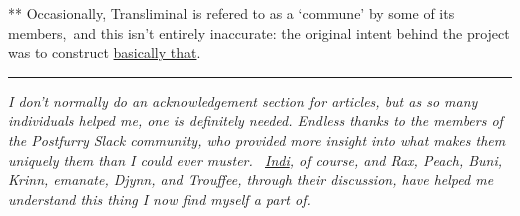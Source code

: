 ** Occasionally, Transliminal is refered to as a `commune' by some of
its members,~and this isn't entirely inaccurate: the original intent
behind the project was to construct
\href{http://wiki.postfurry.net/wiki/Lapinian_Embassy}{basically that}.

\begin{center}\rule{0.5\linewidth}{\linethickness}\end{center}

\emph{I don't normally do an acknowledgement section for articles, but
as so many individuals helped me, one is definitely needed. Endless
thanks to the members of the Postfurry Slack community, who provided
more insight into what makes them uniquely them than I could ever
muster.{~ \href{https://twitter.com/indilatrani}{Indi}}, of course, and
Rax, Peach, Buni, Krinn, emanate, Djynn, and Trouffee, through their
discussion, have helped me understand this thing I now find myself a
part of.}
